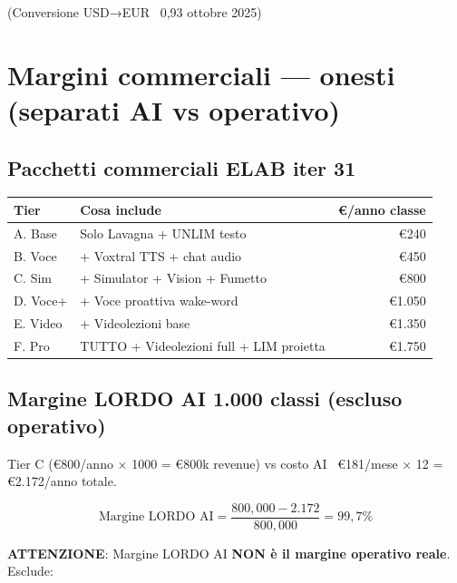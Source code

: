 \documentclass[12pt,a4paper]{article}
\begin{document}
(Conversione USD→EUR ~0,93 ottobre 2025)

\section{Margini commerciali --- onesti (separati AI vs operativo)}

\subsection*{Pacchetti commerciali ELAB iter 31}

\begin{center}
\begin{tabular}{llr}
\toprule
\textbf{Tier} & \textbf{Cosa include} & \textbf{€/anno classe} \\
\midrule
A. Base       & Solo Lavagna + UNLIM testo                    & €240 \\
B. Voce       & + Voxtral TTS + chat audio                    & €450 \\
C. Sim        & + Simulator + Vision + Fumetto                & €800 \\
D. Voce+      & + Voce proattiva wake-word                    & €1.050 \\
E. Video      & + Videolezioni base                           & €1.350 \\
F. Pro        & TUTTO + Videolezioni full + LIM proietta      & €1.750 \\
\bottomrule
\end{tabular}
\end{center}

\subsection*{Margine LORDO AI 1.000 classi (escluso operativo)}

Tier C (€800/anno × 1000 = €800k revenue) vs costo AI ~€181/mese × 12 = €2.172/anno totale.

\begin{equation*}
\text{Margine LORDO AI} = \frac{800{,}000 - 2.172}{800{,}000} = 99{,}7\%
\end{equation*}

\textbf{ATTENZIONE}: Margine LORDO AI \textbf{NON è il margine operativo reale}. Esclude:
\end{document}
